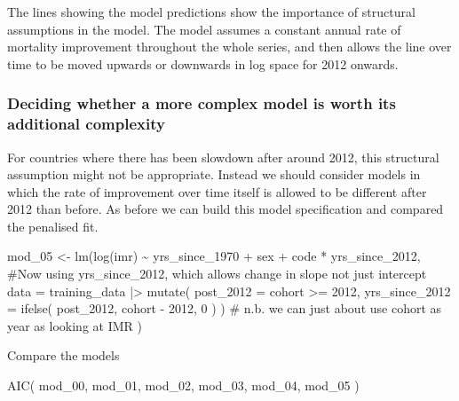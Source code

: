 \documentclass[
  letterpaper,
  DIV=11,
  numbers=noendperiod]{scrartcl}
\newenvironment{Shaded}{\begin{snugshade}}{\end{snugshade}}
\newcommand{\AttributeTok}[1]{\textcolor[rgb]{0.40,0.45,0.13}{#1}}
\newcommand{\CommentTok}[1]{\textcolor[rgb]{0.37,0.37,0.37}{#1}}
\newcommand{\DecValTok}[1]{\textcolor[rgb]{0.68,0.00,0.00}{#1}}
\newcommand{\FunctionTok}[1]{\textcolor[rgb]{0.28,0.35,0.67}{#1}}
\newcommand{\NormalTok}[1]{\textcolor[rgb]{0.00,0.23,0.31}{#1}}
\newcommand{\OtherTok}[1]{\textcolor[rgb]{0.00,0.23,0.31}{#1}}
\newcommand{\SpecialCharTok}[1]{\textcolor[rgb]{0.37,0.37,0.37}{#1}}
\begin{document}
The lines showing the model predictions show the importance of
structural assumptions in the model. The model assumes a constant annual
rate of mortality improvement throughout the whole series, and then
allows the line over time to be moved upwards or downwards in log space
for 2012 onwards.

\hypertarget{deciding-whether-a-more-complex-model-is-worth-its-additional-complexity}{%
\subsubsection{Deciding whether a more complex model is worth its
additional
complexity}\label{deciding-whether-a-more-complex-model-is-worth-its-additional-complexity}}

For countries where there has been slowdown after around 2012, this
structural assumption might not be appropriate. Instead we should
consider models in which the rate of improvement over time itself is
allowed to be different after 2012 than before. As before we can build
this model specification and compared the penalised fit.

\begin{Shaded}
\begin{Highlighting}[]
\NormalTok{mod\_05 }\OtherTok{\textless{}{-}}  \FunctionTok{lm}\NormalTok{(}\FunctionTok{log}\NormalTok{(imr) }\SpecialCharTok{\textasciitilde{}}\NormalTok{ yrs\_since\_1970 }\SpecialCharTok{+}\NormalTok{ sex }\SpecialCharTok{+}\NormalTok{ code }\SpecialCharTok{*}\NormalTok{ yrs\_since\_2012, }
              \CommentTok{\#Now using yrs\_since\_2012, which allows change in slope not just intercept}
             \AttributeTok{data =}\NormalTok{ training\_data }\SpecialCharTok{|\textgreater{}} 
               \FunctionTok{mutate}\NormalTok{(}
                 \AttributeTok{post\_2012 =}\NormalTok{ cohort }\SpecialCharTok{\textgreater{}=} \DecValTok{2012}\NormalTok{,}
                 \AttributeTok{yrs\_since\_2012 =} \FunctionTok{ifelse}\NormalTok{(}
\NormalTok{                   post\_2012, }
\NormalTok{                   cohort }\SpecialCharTok{{-}} \DecValTok{2012}\NormalTok{,}
                   \DecValTok{0}
\NormalTok{                  )}
\NormalTok{                 )}
             \CommentTok{\# n.b. we can just about use cohort as year as looking at IMR}
\NormalTok{          )}
\end{Highlighting}
\end{Shaded}

Compare the models

\begin{Shaded}
\begin{Highlighting}[]
\FunctionTok{AIC}\NormalTok{(}
\NormalTok{  mod\_00, mod\_01, mod\_02, mod\_03, mod\_04, mod\_05}
\NormalTok{)}
\end{Highlighting}
\end{Shaded}
\end{document}
